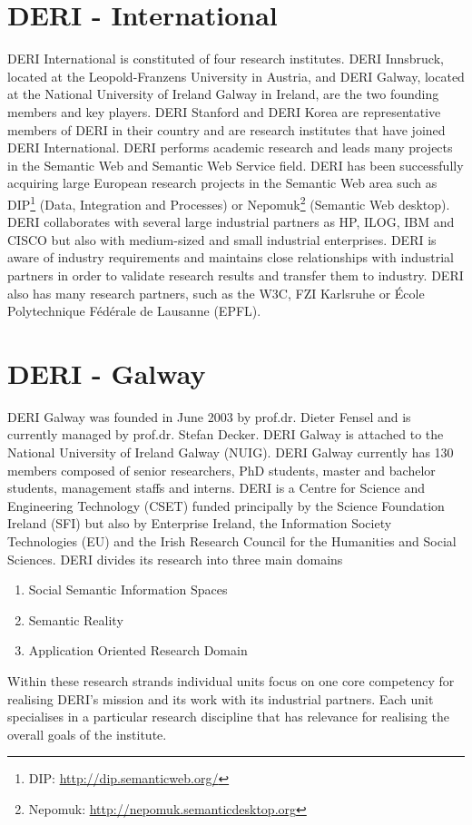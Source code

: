 \section{DERI - International}

DERI International is constituted of four research institutes. DERI Innsbruck,
located at the Leopold-Franzens University in Austria, and DERI Galway,
located at the National University of Ireland Galway in Ireland, are the two
founding members and key players. DERI Stanford and DERI Korea are
representative members of DERI in their country and are research institutes
that have joined DERI International. DERI performs academic research and leads
many projects in the Semantic Web and Semantic Web Service field. DERI has been
successfully acquiring large European research projects in the Semantic Web
area such as DIP\footnote{DIP: \url{http://dip.semanticweb.org/}} (Data,
Integration and Processes) or Nepomuk\footnote{Nepomuk:
\url{http://nepomuk.semanticdesktop.org}} (Semantic Web desktop). DERI
collaborates with several large industrial partners as HP, ILOG, IBM and CISCO
but also with medium-sized and small industrial enterprises. DERI is aware of
industry requirements and maintains close relationships with industrial
partners in order to validate research results and transfer them to industry.
DERI also has many research partners, such as the W3C, FZI Karlsruhe or \'Ecole
Polytechnique F\'ed\'erale de Lausanne (EPFL).

\section{DERI - Galway}

DERI Galway was founded in June 2003 by prof.dr. Dieter Fensel and is
currently managed by prof.dr. Stefan Decker. DERI Galway is attached to the
National University of Ireland Galway (NUIG). DERI Galway currently has 130
members composed of senior researchers, PhD students, master and bachelor
students, management staffs and interns. DERI is a Centre for Science and
Engineering Technology (CSET) funded principally by the Science Foundation
Ireland (SFI) but also by Enterprise Ireland, the Information Society
Technologies (EU) and the Irish Research Council for the Humanities and Social
Sciences. DERI divides its research into three main domains
\begin{enumerate}
  \item Social Semantic Information Spaces
  \item Semantic Reality
  \item Application Oriented Research Domain
\end{enumerate}
Within these research strands individual units focus on one core competency
for realising DERI’s mission and its work with its industrial partners. Each
unit specialises in a particular research discipline that has relevance for
realising the overall goals of the institute.


